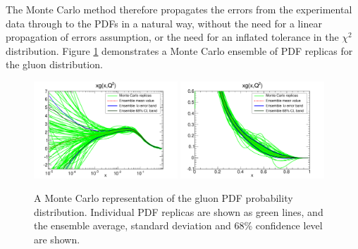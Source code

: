 The Monte Carlo method therefore propagates the errors from the experimental data through to the PDFs in a natural way, without the need for a linear propagation of errors assumption, or the need for an inflated tolerance in the $\chi^2$ distribution. Figure \ref{fig:mcerror} demonstrates a Monte Carlo ensemble of PDF replicas for the gluon distribution.

\begin{figure}[ht]
\centering
\includegraphics[width=0.48\textwidth]{3-PDFdet/figs/pdf_xg_log_rep.pdf}
\includegraphics[width=0.48\textwidth]{3-PDFdet/figs/pdf_xg_rep.pdf}
\caption[A Monte Carlo representation of the gluon PDF probability distribution]{A Monte Carlo representation of the gluon PDF probability distribution. Individual PDF replicas are shown as green lines, and the ensemble average, standard deviation and 68\% confidence level are shown.}
\label{fig:mcerror}
\end{figure}

%
%
%
%

